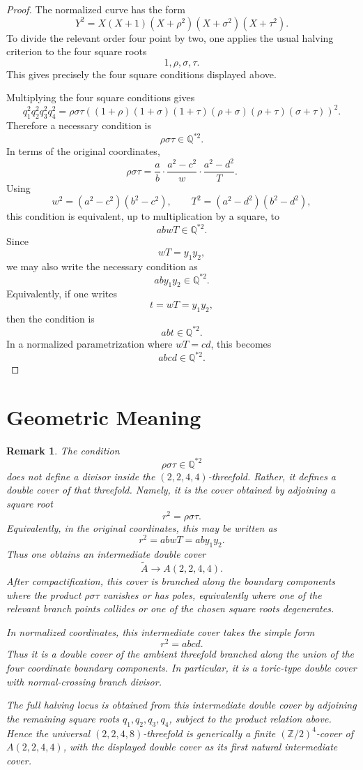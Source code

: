 \documentclass[11pt]{article}
\newtheorem{remark}{Remark}
\newcommand{\QQ}{\mathbb{Q}}
\begin{document}
\begin{proof}
The normalized curve has the form
\[
Y^2=X(X+1)(X+\rho^2)(X+\sigma^2)(X+\tau^2).
\]
To divide the relevant order four point by two, one applies the usual halving criterion to the four square roots
\[
1,\rho,\sigma,\tau.
\]
This gives precisely the four square conditions displayed above.

Multiplying the four square conditions gives
\[
q_1^2q_2^2q_3^2q_4^2
=
\rho\sigma\tau
\left(
(1+\rho)(1+\sigma)(1+\tau)
(\rho+\sigma)(\rho+\tau)(\sigma+\tau)
\right)^2.
\]
Therefore a necessary condition is
\[
\rho\sigma\tau\in \QQ^{*2}.
\]
In terms of the original coordinates,
\[
\rho\sigma\tau
=
\frac{a}{b}\cdot
\frac{a^2-c^2}{w}\cdot
\frac{a^2-d^2}{T}.
\]
Using
\[
w^2=(a^2-c^2)(b^2-c^2),
\qquad
T^2=(a^2-d^2)(b^2-d^2),
\]
this condition is equivalent, up to multiplication by a square, to
\[
abwT\in \QQ^{*2}.
\]
Since
\[
wT=y_1y_2,
\]
we may also write the necessary condition as
\[
ab y_1y_2\in \QQ^{*2}.
\]
Equivalently, if one writes
\[
t=wT=y_1y_2,
\]
then the condition is
\[
abt\in \QQ^{*2}.
\]
In a normalized parametrization where \(wT=cd\), this becomes
\[
abcd\in \QQ^{*2}.
\]
\end{proof}

\section*{Geometric Meaning}

\begin{remark}
The condition
\[
\rho\sigma\tau\in \QQ^{*2}
\]
does not define a divisor inside the \((2,2,4,4)\)-threefold. Rather, it defines a double cover of that threefold. Namely, it is the cover obtained by adjoining a square root
\[
r^2=\rho\sigma\tau.
\]
Equivalently, in the original coordinates, this may be written as
\[
r^2=abwT=ab y_1y_2.
\]
Thus one obtains an intermediate double cover
\[
\widetilde A \longrightarrow A(2,2,4,4).
\]
After compactification, this cover is branched along the boundary components where the product \(\rho\sigma\tau\) vanishes or has poles, equivalently where one of the relevant branch points collides or one of the chosen square roots degenerates.

In normalized coordinates, this intermediate cover takes the simple form
\[
r^2=abcd.
\]
Thus it is a double cover of the ambient threefold branched along the union of the four coordinate boundary components. In particular, it is a toric-type double cover with normal-crossing branch divisor.

The full halving locus is obtained from this intermediate double cover by adjoining the remaining square roots \(q_1,q_2,q_3,q_4\), subject to the product relation above. Hence the universal \((2,2,4,8)\)-threefold is generically a finite \((\mathbb Z/2)^4\)-cover of \(A(2,2,4,4)\), with the displayed double cover as its first natural intermediate cover.
\end{remark}
\end{document}
